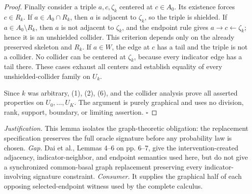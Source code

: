 \documentclass{article}
\begin{document}
\begin{proof}
Finally consider a triple \(a,c,\zeta_k\) centered at \(c\in A_0\).  Its existence forces \(c\in R_k\).  If \(a\in A_0\cap R_k\), then \(a\) is adjacent to \(\zeta_k\), so the triple is shielded.  If \(a\in A_0\setminus R_k\), then \(a\) is not adjacent to \(\zeta_k\), and the endpoint rule gives \(a\to c\leftarrow\zeta_k\); hence it is an unshielded collider.  This criterion depends only on the already preserved skeleton and \(R_k\).  If \(a\in W\), the edge at \(c\) has a tail and the triple is not a collider.  No collider can be centered at \(\zeta_k\), because every indicator edge has a tail there.  These cases exhaust all centers and establish equality of every unshielded-collider family on \(U_k\).

Since \(k\) was arbitrary, (1), (2), (6), and the collider analysis prove all asserted properties on \(U_0,\ldots,U_K\).  The argument is purely graphical and uses no division, rank, support, boundary, or limiting assertion.  \(\square\)
\end{proof}
\par\smallskip\noindent \textit{Justification.} This lemma isolates the graph-theoretic obligation: the replacement specification preserves the full oracle signature before any probability law is chosen. \textit{Gap.} Dai et al., Lemmas 4--6 on pp. 6--7, give the intervention-created adjacency, indicator-neighbor, and endpoint semantics used here, but do not give a synchronized common-basal graph replacement preserving every indicator-involving signature constraint. \textit{Consumer.} It supplies the graphical half of each opposing selected-endpoint witness used by the complete calculus.
\end{document}
